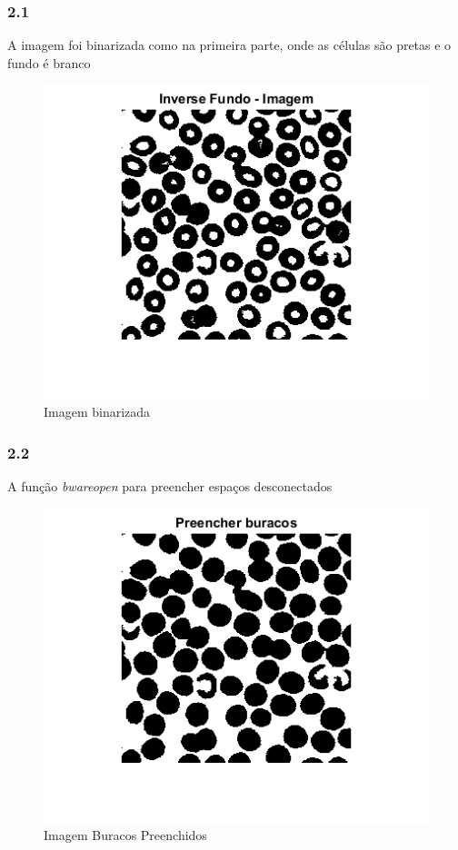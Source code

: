 \documentclass[journal]{IEEEtran}
\begin{document}
\subsubsection*{2.1}
A imagem foi binarizada como na primeira parte, onde as células são pretas e o fundo é branco

\begin{figure}[!htb]
	\centering
	\includegraphics[scale=0.5]{2-1.png}
	\caption{Imagem binarizada}
	\label{Original}
\end{figure}

\subsubsection*{2.2}
A função \textit{bwareopen} para preencher espaços desconectados\newline
\\ 

\begin{figure}[!htb]
	\centering
	\includegraphics[scale=0.5]{2-buracos.png}
	\caption{Imagem Buracos Preenchidos}
	\label{Original}
\end{figure}
\end{document}
